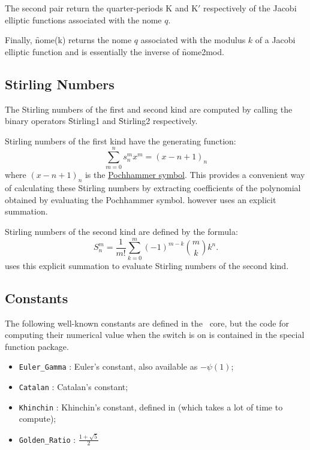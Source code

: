 The second pair return the quarter-periods K and K$'$ respectively of
the Jacobi elliptic functions associated with the nome $q$.

Finally, \f{nome(k)} returns the nome $q$ associated with the modulus $k$ of
a Jacobi elliptic function and is essentially the inverse of \f{nome2mod}.

\subsection{Stirling Numbers}
\hypertarget{STIRL}{}
The Stirling numbers of the first and second kind are computed 
by calling the binary operators \f{Stirling1} and \f{Stirling2}
respectively.

Stirling numbers of the first kind have the generating function:
$$\sum_{m=0}^n s_n^m x^m  =  (x-n+1)_n$$
where $(x-n+1)_n$ is the \hyperlink{POCH}{Pochhammer symbol}. This provides
a convenient way of calculating these Stirling numbers by
extracting coefficients of the polynomial obtained by evaluating the
Pochhammer symbol.  \REDUCE however uses an explicit summation.

Stirling numbers of the second kind are defined by the formula:
$$S_n^m = \frac{1}{m!} \sum_{k=0}^m (-1)^{m-k} \binom{m}{k} k^n.$$
\REDUCE uses this explicit summation to evaluate Stirling numbers of the
second kind.

\subsection{Constants}
\hypertarget{CONSTS}{}

The following well-known constants are defined in the \REDUCE\ core,
but the code for computing their numerical value when the switch 
is on is contained in the special function package.
\begin{itemize}
\item \texttt{Euler\_Gamma} : Euler's constant, also available as $-\psi(1)$;
\item \texttt{Catalan} : Catalan's constant;
\item \texttt{Khinchin} : Khinchin's constant, defined in \cite{Khinchin:64}
(which takes a lot of time to compute);
\item \texttt{Golden\_Ratio} : $\displaystyle\frac{1 + \sqrt{5}}{2}$ 
\end{itemize}


